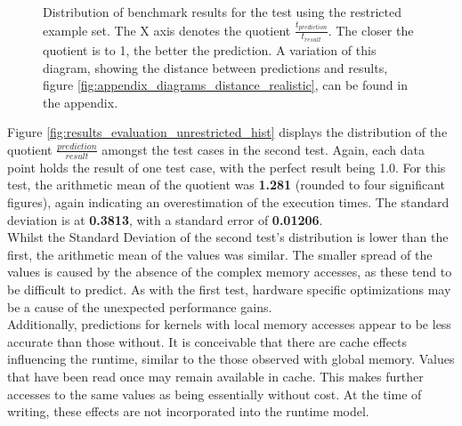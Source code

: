 \begin{figure}[h]
    \begin{center}
    \end{center}
    \caption{Distribution of benchmark results for the test using the restricted example set. The X axis denotes the quotient $\frac{t_{prediction}}{t_{result}}$. The closer the quotient is to 1, the better the prediction. A variation of this diagram, showing the distance between predictions and results, figure \ref{fig:appendix_diagrams_distance_realistic}, can be found in the appendix.}
    \label{fig:results_distribution_realistic}
\end{figure}

Figure \ref{fig:results_evaluation_unrestricted_hist} displays the distribution of the quotient $\frac{prediction}{result}$ amongst the test cases in the second test. Again, each data point holds the result of one test case, with the perfect result being 1.0. For this test, the arithmetic mean of the quotient was \textbf{1.281} (rounded to four significant figures), again indicating an overestimation of the execution times. The standard deviation is at \textbf{0.3813}, with a standard error of \textbf{0.01206}. \\

Whilst the Standard Deviation of the second test's distribution is lower than the first, the arithmetic mean of the values was similar. The smaller spread of the values is caused by the absence of the complex memory accesses, as these tend to be difficult to predict. As with the first test, hardware specific optimizations may be a cause of the unexpected performance gains. \\

Additionally, predictions for kernels with local memory accesses appear to be less accurate than those without. It is conceivable that there are cache effects influencing the runtime, similar to the those observed with global memory. Values that have been read once may remain available in cache. This makes further accesses to the same values as being essentially without cost. At the time of writing, these effects are not incorporated into the runtime model.